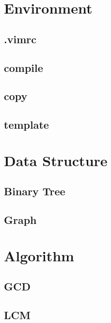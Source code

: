 \documentclass[a4paper, landscape, 8pt]{article}
\begin{document}
\begin{multicols*}{3}
\maketitle
\tableofcontents

\section{Environment}
\subsection{.vimrc}

\subsection{compile}

\subsection{copy}

\subsection{template}


\section{Data Structure}
\subsection{Binary Tree}

\subsection{Graph}


\section{Algorithm}
\subsection{GCD}

\subsection{LCM}


\end{multicols*}
\end{document}
